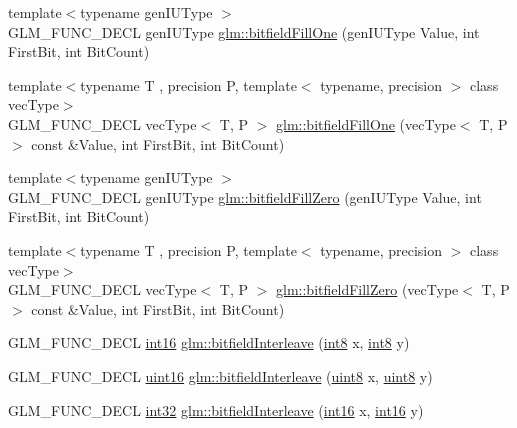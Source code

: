 \begin{DoxyCompactItemize}
\item 
{\footnotesize template$<$typename gen\+I\+U\+Type $>$ }\\G\+L\+M\+\_\+\+F\+U\+N\+C\+\_\+\+D\+E\+CL gen\+I\+U\+Type \hyperlink{group__gtc__bitfield_ga46f9295abe3b5c7658f5b13c7f819f0a}{glm\+::bitfield\+Fill\+One} (gen\+I\+U\+Type Value, int First\+Bit, int Bit\+Count)
\item 
{\footnotesize template$<$typename T , precision P, template$<$ typename, precision $>$ class vec\+Type$>$ }\\G\+L\+M\+\_\+\+F\+U\+N\+C\+\_\+\+D\+E\+CL vec\+Type$<$ T, P $>$ \hyperlink{group__gtc__bitfield_gad789042e84e8292ae95dc1af856f2ad5}{glm\+::bitfield\+Fill\+One} (vec\+Type$<$ T, P $>$ const \&Value, int First\+Bit, int Bit\+Count)
\item 
{\footnotesize template$<$typename gen\+I\+U\+Type $>$ }\\G\+L\+M\+\_\+\+F\+U\+N\+C\+\_\+\+D\+E\+CL gen\+I\+U\+Type \hyperlink{group__gtc__bitfield_ga697b86998b7d74ee0a69d8e9f8819fee}{glm\+::bitfield\+Fill\+Zero} (gen\+I\+U\+Type Value, int First\+Bit, int Bit\+Count)
\item 
{\footnotesize template$<$typename T , precision P, template$<$ typename, precision $>$ class vec\+Type$>$ }\\G\+L\+M\+\_\+\+F\+U\+N\+C\+\_\+\+D\+E\+CL vec\+Type$<$ T, P $>$ \hyperlink{group__gtc__bitfield_gaddba3196316b0bd240295b09b43c2958}{glm\+::bitfield\+Fill\+Zero} (vec\+Type$<$ T, P $>$ const \&Value, int First\+Bit, int Bit\+Count)
\item 
G\+L\+M\+\_\+\+F\+U\+N\+C\+\_\+\+D\+E\+CL \hyperlink{group__gtc__type__precision_ga2945a61d12771f8954994fcddf02b021}{int16} \hyperlink{group__gtc__bitfield_ga479134317bc95d99f2b2e235d3db287b}{glm\+::bitfield\+Interleave} (\hyperlink{group__gtc__type__precision_ga96254f9c1c4506fc8eb5cf3301ce8565}{int8} x, \hyperlink{group__gtc__type__precision_ga96254f9c1c4506fc8eb5cf3301ce8565}{int8} y)
\item 
G\+L\+M\+\_\+\+F\+U\+N\+C\+\_\+\+D\+E\+CL \hyperlink{group__gtc__type__precision_gad8c2939e1fdd8e5828b31d95c52255d5}{uint16} \hyperlink{group__gtc__bitfield_ga0700a3ceb088a0ecc23d76c154096061}{glm\+::bitfield\+Interleave} (\hyperlink{group__gtc__type__precision_ga1a7dcd8aac97cc8020817c94049deff2}{uint8} x, \hyperlink{group__gtc__type__precision_ga1a7dcd8aac97cc8020817c94049deff2}{uint8} y)
\item 
G\+L\+M\+\_\+\+F\+U\+N\+C\+\_\+\+D\+E\+CL \hyperlink{group__gtc__type__precision_ga632d8b25f6b61659f39ea4321fab92a4}{int32} \hyperlink{group__gtc__bitfield_ga1a0264598647ae00a596865af4e1e878}{glm\+::bitfield\+Interleave} (\hyperlink{group__gtc__type__precision_ga2945a61d12771f8954994fcddf02b021}{int16} x, \hyperlink{group__gtc__type__precision_ga2945a61d12771f8954994fcddf02b021}{int16} y)

\end{DoxyCompactItemize}
